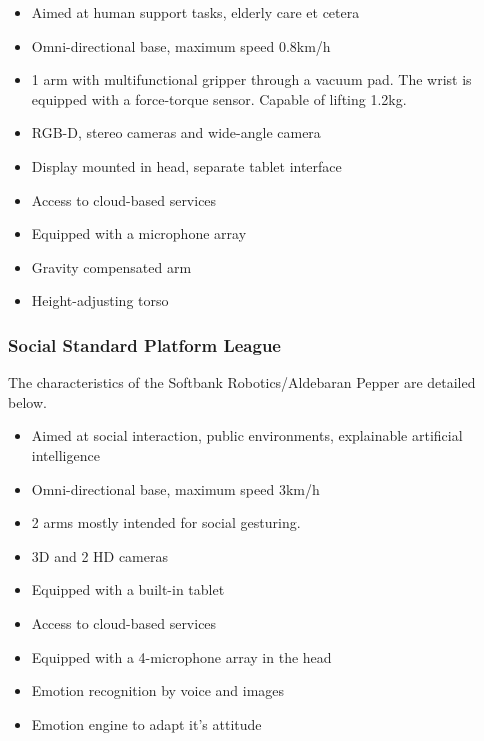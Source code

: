 \begin{itemize}
    \item Aimed at human support tasks, elderly care et cetera
    \item Omni-directional base, maximum speed 0.8km/h
    \item 1 arm with multifunctional gripper through a vacuum pad. The wrist is equipped with a force-torque sensor. Capable of lifting 1.2kg. 
    \item RGB-D, stereo cameras and wide-angle camera
    \item Display mounted in head, separate tablet interface
    \item Access to cloud-based services
    \item Equipped with a microphone array
    \item Gravity compensated arm
    \item Height-adjusting torso
\end{itemize}

\subsubsection{Social Standard Platform League}
The characteristics of the Softbank Robotics/Aldebaran Pepper are detailed below. 

\begin{itemize}
    \item Aimed at social interaction, public environments, explainable artificial intelligence
    \item Omni-directional base, maximum speed 3km/h
    \item 2 arms mostly intended for social gesturing. 
    \item 3D and 2 HD cameras
    \item Equipped with a built-in tablet
    \item Access to cloud-based services
    \item Equipped with a 4-microphone array in the head
    \item Emotion recognition by voice and images
    \item Emotion engine to adapt it's attitude
\end{itemize}